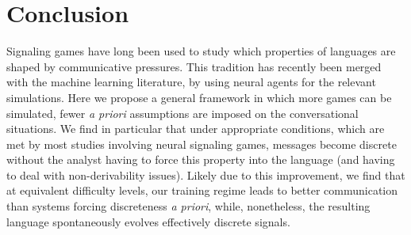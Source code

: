 \documentclass[11pt,a4paper]{article}
\newcommand{\nbEC}[1]{{\leavevmode\color{blue}{\scriptsize#1}}}
\begin{document}

\section{Conclusion}

Signaling games have long been used to study which properties of languages are shaped by communicative pressures. This tradition has recently been merged with the machine learning literature, by using neural agents for the relevant simulations. Here we propose a general framework in which more games can be simulated, fewer \emph{a priori} assumptions are imposed on the conversational situations. We find in particular that under appropriate conditions, which are met by most\nbEC{all} studies involving neural signaling games, messages become discrete without the analyst having to force this property into the language (and having to deal with non-derivability issues). Likely due to this improvement, we find that at equivalent difficulty levels, our training regime leads to better communication than systems forcing discreteness \emph{a priori}, while, nonetheless, the resulting language spontaneously evolves effectively discrete signals. 






\end{document}
